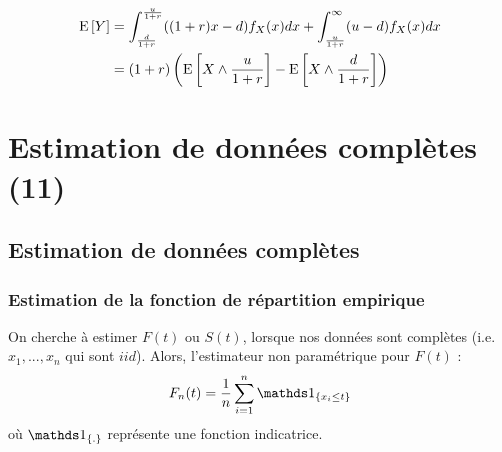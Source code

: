 \documentclass[12pt, french]{report}
\begin{document}

\begin{align*}
\mathrm{E} \left[ Y \right]	& = \int_{\frac{d}{1+r}}^{\frac{u}{1+r}} ((1+r) x - d) f_X(x) dx + \int_{\frac{u}{1+r}}^{\infty} (u-d) f_X(x) dx \\
	& = (1+r) \left( \mathrm{E} \left[ X \wedge \frac{u}{1+r} \right] - \mathrm{E} \left[ X \wedge \frac{d}{1+r} \right]   \right) \\
\end{align*}


\chapter{Estimation de données complètes (11)}
\setcounter{section}{1}

\section{Estimation de données complètes}
\subsection{Estimation de la fonction de répartition empirique}
On cherche à estimer $F(t)$ ou $S(t)$, lorsque nos données sont complètes (i.e. $x_1, ..., x_n$ qui sont $iid$). Alors, l'estimateur non paramétrique pour $F(t)$ : 
\begin{equation}
F_n(t)	 = \frac{1}{n} \sum_{i=1}^{n} \indic{x_i \leq t}
\end{equation}
où $\indic{.}$ représente une fonction indicatrice.
\end{document}

